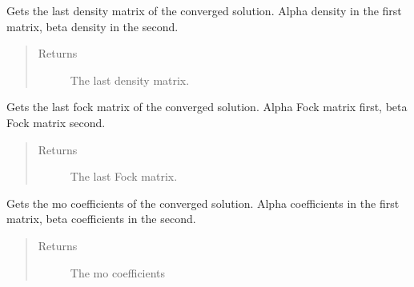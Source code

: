 \documentclass[letterpaper,10pt,english]{sphinxmanual}
\begin{document}
\begin{fulllineitems}
\begin{fulllineitems}
\label{\detokenize{UHF:hf.HartreeFock.UHF.MF.get_last_dens}}
Gets the last density matrix of the converged solution.
Alpha density in the first matrix, beta density in the second.
\begin{quote}\begin{description}
\item[{Returns}] \leavevmode
The last density matrix.

\end{description}\end{quote}

\end{fulllineitems}


\begin{fulllineitems}
\label{\detokenize{UHF:hf.HartreeFock.UHF.MF.get_last_fock}}
Gets the last fock matrix of the converged solution.
Alpha Fock matrix first, beta Fock matrix second.
\begin{quote}\begin{description}
\item[{Returns}] \leavevmode
The last Fock matrix.

\end{description}\end{quote}

\end{fulllineitems}


\begin{fulllineitems}
\label{\detokenize{UHF:hf.HartreeFock.UHF.MF.get_mo_coeff}}
Gets the mo coefficients of the converged solution.
Alpha coefficients in the first matrix, beta coefficients in the second.
\begin{quote}\begin{description}
\item[{Returns}] \leavevmode
The mo coefficients

\end{description}\end{quote}


\end{fulllineitems}
\end{fulllineitems}
\end{document}
